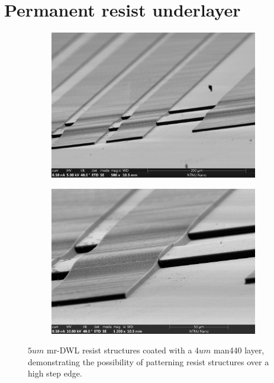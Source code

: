 \section{Permanent resist underlayer}

\begin{figure}
\centering
\begin{subfigure}{.5\textwidth}
  \centering
  \includegraphics[width=\linewidth]{fig/mr-DWL/sem_mr-dwl-2.jpg}
  \label{fig:sfig1}
\end{subfigure}%

\begin{subfigure}{.5\textwidth}
  \centering
  \includegraphics[width=\linewidth]{fig/mr-DWL/sem_mr-dwl.jpg}
  \label{fig:sfig2}
\end{subfigure}
\caption{$5um$ mr-DWL resist structures coated with a $4um$ man440 layer, demonstrating the possibility of patterning resist structures over a high step edge. }
\label{fig:fig}
\end{figure}

